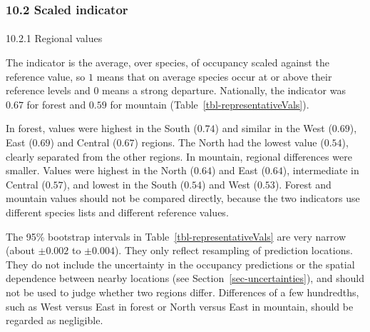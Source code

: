 \documentclass[
  letterpaper,
  DIV=11,
  numbers=noendperiod]{scrartcl}
\makeatletter
\let\oldparagraph\paragraph
\renewcommand{\paragraph}{
    \@ifstar
      \xxxParagraphStar
      \xxxParagraphNoStar
  }
\newcommand{\xxxParagraphStar}[1]{\oldparagraph*{#1}\mbox{}}
\newcommand{\xxxParagraphNoStar}[1]{\oldparagraph{#1}\mbox{}}
\makeatother
\begin{document}
\subsubsection{10.2 Scaled indicator}\label{sec-indicatorValues}

\paragraph{10.2.1 Regional values}\label{sec-regionalValues}

The indicator is the average, over species, of occupancy scaled against
the reference value, so \(1\) means that on average species occur at or
above their reference levels and \(0\) means a strong departure.
Nationally, the indicator was \(0.67\) for forest and \(0.59\) for
mountain (Table~\ref{tbl-representativeVals}).

In forest, values were highest in the South (\(0.74\)) and similar in
the West (\(0.69\)), East (\(0.69\)) and Central (\(0.67\)) regions. The
North had the lowest value (\(0.54\)), clearly separated from the other
regions. In mountain, regional differences were smaller. Values were
highest in the North (\(0.64\)) and East (\(0.64\)), intermediate in
Central (\(0.57\)), and lowest in the South (\(0.54\)) and West
(\(0.53\)). Forest and mountain values should not be compared directly,
because the two indicators use different species lists and different
reference values.

The 95\% bootstrap intervals in Table~\ref{tbl-representativeVals} are
very narrow (about \(\pm 0.002\) to \(\pm 0.004\)). They only reflect
resampling of prediction locations. They do not include the uncertainty
in the occupancy predictions or the spatial dependence between nearby
locations (see Section~\ref{sec-uncertainties}), and should not be used
to judge whether two regions differ. Differences of a few hundredths,
such as West versus East in forest or North versus East in mountain,
should be regarded as negligible.
\end{document}
